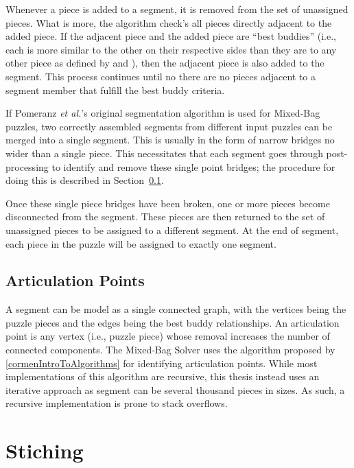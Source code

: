 Whenever a piece is added to a segment, it is removed from the set of unassigned pieces. What is more, the algorithm check's all pieces directly adjacent to the added piece.  If the adjacent piece and the added piece are ``best buddies'' (i.e., each is more similar to the other on their respective sides than they are to any other piece as defined by \cite{pomeranz2011} and \cite{paikin2015}), then the adjacent piece is also added to the segment.  This process continues until no there are no pieces adjacent to a segment member that fulfill the best buddy criteria.

If Pomeranz \textit{et al.}'s original segmentation algorithm is used for Mixed-Bag puzzles, two correctly assembled segments from different input puzzles can be merged into a single segment.  This is usually in the form of narrow bridges no wider than a single piece. This necessitates that each segment goes through post-processing to identify and remove these single point bridges; the procedure for doing this is described in Section~\ref{sec:ArticulationPoints}.  

Once these single piece bridges have been broken, one or more pieces become disconnected from the segment.  These pieces are then returned to the set of unassigned pieces to be assigned to a different segment.  At the end of segment, each piece in the puzzle will be assigned to exactly one segment.

\subsection{Articulation Points}\label{sec:ArticulationPoints}

A segment can be model as a single connected graph, with the vertices being the puzzle pieces and the edges being the best buddy relationships.  An articulation point is any vertex (i.e., puzzle piece) whose removal increases the number of connected components.  The Mixed-Bag Solver uses the algorithm proposed by \ref{cormenIntroToAlgorithms} for identifying articulation points.  While most implementations of this algorithm are recursive, this thesis instead uses an iterative approach as segment can be several thousand pieces in sizes.  As such, a recursive implementation is prone to stack overflows.

\section{Stiching}\label{sec:stitchingPieceSolving}

